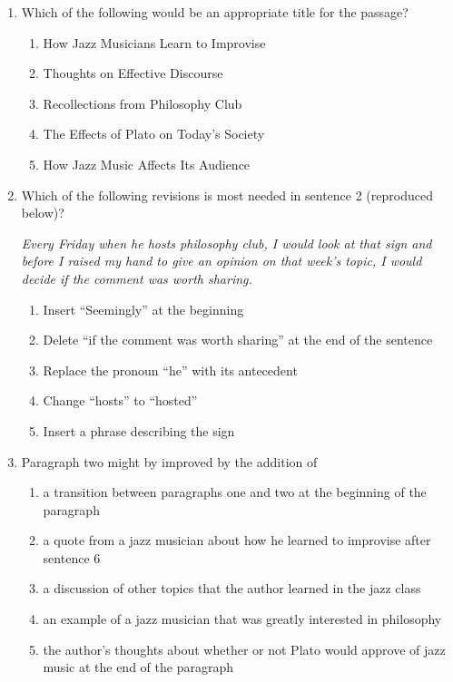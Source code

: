 \begin{enumerate}

\item Which of the following would be an appropriate title for the passage?

\begin{enumerate}[label=(\Alph*)]
\item How Jazz Musicians Learn to Improvise
\item Thoughts on Effective Discourse
\item Recollections from Philosophy Club
\item The Effects of Plato on Today's Society
\item How Jazz Music Affects Its Audience
\end{enumerate}

\item Which of the following revisions is most needed in sentence 2 (reproduced below)? 

\textit{Every Friday when he hosts philosophy club, I would look at that sign and before I raised my hand to give an opinion on that week's topic, I would decide if the comment was worth sharing.}
 
\begin{enumerate}[label=(\Alph*)]
\item Insert ``Seemingly'' at the beginning
\item Delete ``if the comment was worth sharing'' at the end of the sentence
\item Replace the pronoun ``he'' with its antecedent 
\item Change ``hosts'' to ``hosted''
\item Insert a phrase describing the sign
\end{enumerate}

\item Paragraph two might by improved by the addition of 
\begin{enumerate}[label=(\Alph*)]
\item a transition between paragraphs one and two at the beginning of the paragraph
\item a quote from a jazz musician about how he learned to improvise after sentence 6
\item a discussion of other topics that the author learned in the jazz class
\item an example of a jazz musician that was greatly interested in philosophy 
\item the author's thoughts about whether or not Plato would approve of jazz music at the end of the paragraph
\end{enumerate}
\end{enumerate}